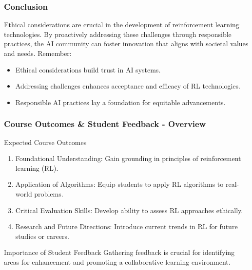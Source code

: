 \documentclass[aspectratio=169]{beamer}
\begin{document}
\begin{frame}[fragile]
    \frametitle{Conclusion}
    Ethical considerations are crucial in the development of reinforcement learning technologies. By proactively addressing these challenges through responsible practices, the AI community can foster innovation that aligns with societal values and needs. Remember:
    \begin{itemize}
        \item Ethical considerations build trust in AI systems.
        \item Addressing challenges enhances acceptance and efficacy of RL technologies.
        \item Responsible AI practices lay a foundation for equitable advancements.
    \end{itemize}
\end{frame}

\begin{frame}[fragile]
    \frametitle{Course Outcomes & Student Feedback - Overview}
    \begin{block}{Expected Course Outcomes}
        \begin{enumerate}
            \item Foundational Understanding: 
            Gain grounding in principles of reinforcement learning (RL).
            \item Application of Algorithms: 
            Equip students to apply RL algorithms to real-world problems.
            \item Critical Evaluation Skills: 
            Develop ability to assess RL approaches ethically.
            \item Research and Future Directions: 
            Introduce current trends in RL for future studies or careers.
        \end{enumerate}
    \end{block}

    \begin{block}{Importance of Student Feedback}
        Gathering feedback is crucial for identifying areas for enhancement and promoting a collaborative learning environment.
    \end{block}
\end{frame}
\end{document}
